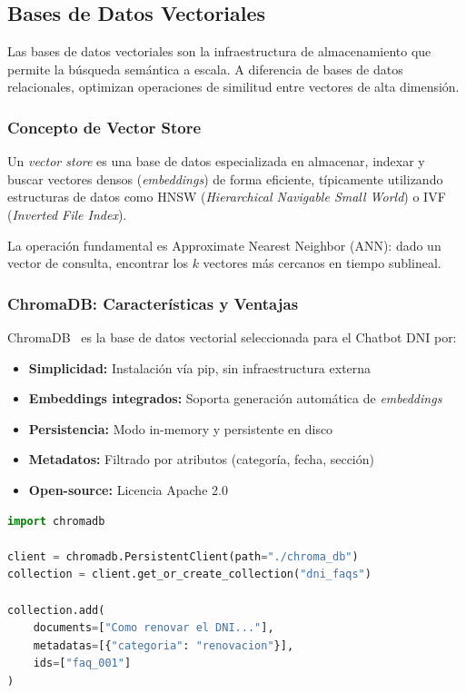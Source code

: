 \subsection{Bases de Datos Vectoriales}
\label{subsec:bases-datos-vectoriales}

Las bases de datos vectoriales son la infraestructura de almacenamiento que permite la b\'usqueda sem\'antica a escala. A diferencia de bases de datos relacionales, optimizan operaciones de similitud entre vectores de alta dimensi\'on.

\subsubsection{Concepto de Vector Store}
\label{subsubsec:vector-store}

Un \textit{vector store} es una base de datos especializada en almacenar, indexar y buscar vectores densos (\textit{embeddings}) de forma eficiente, t\'ipicamente utilizando estructuras de datos como HNSW (\textit{Hierarchical Navigable Small World}) o IVF (\textit{Inverted File Index}).

La operaci\'on fundamental es Approximate Nearest Neighbor (ANN): dado un vector de consulta, encontrar los $k$ vectores m\'as cercanos en tiempo sublineal.

\subsubsection{ChromaDB: Caracter\'isticas y Ventajas}
\label{subsubsec:chromadb}

ChromaDB~\cite{chromadb2023} es la base de datos vectorial seleccionada para el Chatbot DNI por:

\begin{itemize}
    \item \textbf{Simplicidad:} Instalaci\'on v\'ia pip, sin infraestructura externa
    \item \textbf{Embeddings integrados:} Soporta generaci\'on autom\'atica de \textit{embeddings}
    \item \textbf{Persistencia:} Modo in-memory y persistente en disco
    \item \textbf{Metadatos:} Filtrado por atributos (categor\'ia, fecha, secci\'on)
    \item \textbf{Open-source:} Licencia Apache 2.0
\end{itemize}

\begin{lstlisting}[language=Python, caption={Ejemplo de uso de ChromaDB.}]
import chromadb

client = chromadb.PersistentClient(path="./chroma_db")
collection = client.get_or_create_collection("dni_faqs")

collection.add(
    documents=["Como renovar el DNI..."],
    metadatas=[{"categoria": "renovacion"}],
    ids=["faq_001"]
)
\end{lstlisting}

